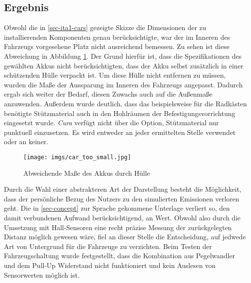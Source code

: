 \documentclass[.../Dokumentation.tex]{subfiles}
\begin{document}
\subsection{Ergebnis}\label{sec-ita1-result}
Obwohl die in \ref{sec-ita1-cars} gezeigte Skizze die Dimensionen der zu 
installierenden Komponenten genau berücksichtigte, war der im Inneren des 
Fahrzeugs vorgesehene Platz nicht ausreichend bemessen.
Zu sehen ist diese Abweichung in Abbildung \ref{fig-car-too-small}.
Der Grund hierfür ist, dass die Spezifikationen des gewählten Akkus nicht 
berücksichtigten, dass der Akku selbst zusätzlich in einer schützenden Hülle 
verpackt ist. 
Um diese Hülle nicht entfernen zu müssen, wurden die 
Maße der Aussparung im Inneren des Fahrzeugs angepasst. Dadurch ergab 
sich weiter der Bedarf, diesen Zuwachs auch auf die Außenmaße anzuwenden. 
Außerdem wurde deutlich, dass das beispielsweise für die Radkästen benötigte
Stütz\-material auch in den Hohlräumen der Befestigungsvorrichtung 
eingesetzt wurde. \textit{Cura} verfügt nicht über die Option, Stützmaterial nur 
punktuell einzusetzen. Es wird entweder an jeder ermittelten Stelle verwendet 
oder an keiner. 
\begin{figure}[H]
    \begin{center}
    \texttt{[image: imgs/car\_too\_small.jpg]}
    \caption{Abweichende Maße des Akkus durch Hülle}
    \label{fig-car-too-small}
    \end{center}
\end{figure}
\noindent
Durch die Wahl einer abstrakteren Art der Darstellung besteht die Möglichkeit, 
dass der persönliche Bezug des Nutzers zu den simulierten Emissionen verloren 
geht.
Die in \ref{sec-concept} zur Sprache gekommene Unterlage verliert so, den damit 
verbundenen Aufwand berücksichtigend, an Wert.
Obwohl also durch die Umsetzung mit Hall-Sensoren 
eine recht präzise Messung der zurückgelegten Distanz möglich gewesen wäre, 
fiel an dieser Stelle die Entscheidung, auf jedwede Art von Untergrund 
für die Fahrzeuge zu verzichten. 
Beim Testen der Fahrzeugschaltung wurde festgestellt, dass die Kombination aus Pegelwandler und dem Pull-Up Widerstand nicht funktioniert und kein Auslesen von Sensorwerten möglich ist.
\end{document}
